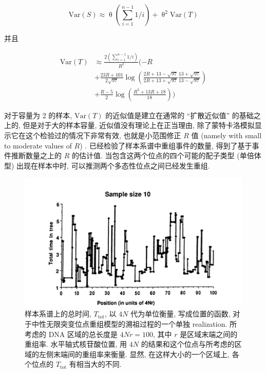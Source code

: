 \documentclass[12pt]{article}
\begin{document}
\begin{equation} \label{eq:14}
    \text{Var}(S) \approx \uptheta \left(\overset{n-1}{\underset{i=1}\sum }1/i \right) + \uptheta ^{2}\text{Var}(T)
\end{equation}

并且

\begin{equation} \label{eq:15}
    \begin{split}
        \text{Var}(T) & \approx \frac{2 \left(\sum_{i=1}^{n-1} 1/i \right)}{R^{2}}(-R \\
        & + \frac{23R+101}{2\sqrt{97}} \log \left(\frac{2R+13-\sqrt{97}}{2R+13+\sqrt{97}} \frac{13+\sqrt{97}}{13-\sqrt{97}} \right) \\
        & + \frac{R-5}{2}\log \left(\frac{R^{2}+13R+18}{18} \right))
    \end{split}
\end{equation}

对于容量为 2 的样本, $\text{Var}(T)$ 的近似值是建立在通常的 ``扩散近似值'' 的基础之上的, 但是对于大的样本容量,
近似值没有理论上在正当理由, 除了蒙特卡洛模拟显示它在这个检验过的情况下非常有效, 也就是小范围修正 $R$ 值 (namely with
small to moderate values of $R$) \parencite{kaplan1985}. \textcite{kaplan1985}
已经检验了样本系谱中重组事件的数量, 得到了基于事件推断数量之上的 $R$ 的估计值. 当包含这两个位点的四个可能的配子类型
(单倍体型) 出现在样本中时, 可以推测两个多态性位点之间已经发生重组.

\begin{figure}
    \centering
    \includegraphics{coalescent-process.images/image5.png}
    \caption{样本系谱上的总时间, $T_{\text{tot}}$, 以 $4N$ 代为单位衡量, 写成位置的函数,
        对于中性无限突变位点重组模型的溯祖过程的一个单独 realization. 所考虑的 DNA 区域的总长度是 $4Nr=100$, 其中 $r$
        是区域末端之间的重组率. 水平轴式核苷酸位置, 用 $4N$ 的结果和这个位点与所考虑的区域的左侧末端间的重组率来衡量. 显然,
        在这样大小的一个区域上, 各个位点的 $T_{\text{tot}}$ 有相当大的不同.}
    \label{fig:5}
\end{figure}
\end{document}

